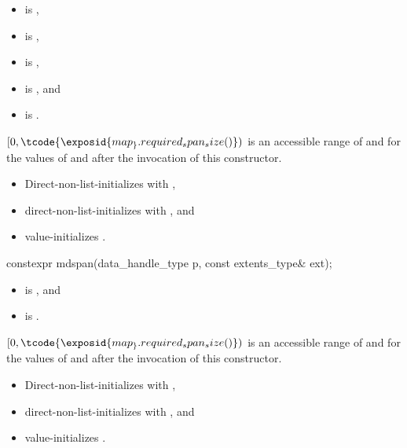 \begin{itemdescr}
\pnum
\constraints
\begin{itemize}
\item
{} is ,
\item
{} is ,
\item
{} is ,
\item
{} is , and
\item
{} is .
\end{itemize}

\pnum
\expects
$[0, \tcode{\exposid{map_}.required_span_size()})$ is
an accessible range of  and 
for the values of  and 
after the invocation of this constructor.

\pnum
\effects
\begin{itemize}
\item
Direct-non-list-initializes  with ,
\item
direct-non-list-initializes  with , and
\item
value-initializes .
\end{itemize}
\end{itemdescr}

%
\begin{itemdecl}
constexpr mdspan(data_handle_type p, const extents_type& ext);
\end{itemdecl}

\begin{itemdescr}
\pnum
\constraints
\begin{itemize}
\item
{} is , and
\item
{} is .
\end{itemize}

\pnum
\expects
$[0, \tcode{\exposid{map_}.required_span_size()})$ is
an accessible range of  and 
for the values of  and 
after the invocation of this constructor.

\pnum
\effects
\begin{itemize}
\item
Direct-non-list-initializes  with ,
\item
direct-non-list-initializes  with , and
\item
value-initializes .
\end{itemize}
\end{itemdescr}

